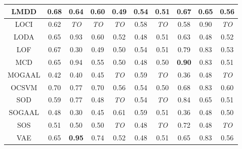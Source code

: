 \begin{table*}[!t]
\begin{tabular}{|c|c|c|c|c|c|c|c|c|c|}
\hline
                LMDD &                0.68 &             0.64 &            0.60 &           0.49 &           0.54 &          0.51 &                0.67 &            0.65 &           0.56 \\
\hline
                LOCI &                0.62 &      \textit{TO} &     \textit{TO} &    \textit{TO} &           0.58 &   \textit{TO} &                0.58 &            0.90 &    \textit{TO} \\
\hline
                LODA &                0.65 &             0.93 &            0.60 &           0.52 &           0.48 &          0.51 &                0.63 &            0.48 &           0.52 \\
\hline
                LOF &                0.67 &             0.30 &            0.49 &           0.50 &           0.54 &          0.51 &                0.79 &            0.83 &           0.53 \\
\hline
                MCD &                0.65 &             0.94 &            0.55 &           0.50 &           0.48 &          0.50 &       \textbf{0.90} &            0.83 &           0.51 \\
\hline
        MOGAAL &                0.42 &             0.40 &            0.45 &    \textit{TO} &           0.59 &   \textit{TO} &                0.36 &            0.48 &    \textit{TO} \\
\hline
                OCSVM &                0.70 &             0.77 &            0.70 &           0.56 &           0.54 &          0.50 &                0.68 &            0.83 &           0.60 \\
\hline
                SOD &                0.59 &             0.77 &            0.48 &    \textit{TO} &           0.54 &   \textit{TO} &                0.84 &            0.65 &           0.51 \\
\hline
        SOGAAL &                0.48 &             0.30 &            0.45 &           0.61 &           0.59 &          0.51 &                0.36 &            0.48 &           0.50 \\
\hline
                SOS &                0.51 &             0.50 &            0.50 &    \textit{TO} &           0.48 &   \textit{TO} &                0.72 &            0.48 &    \textit{TO} \\
\hline
                VAE &                0.65 &    \textbf{0.95} &            0.74 &           0.52 &           0.48 &          0.51 &                0.65 &            0.83 &           0.56 \\
\hline
\end{tabular}
\end{table*}

